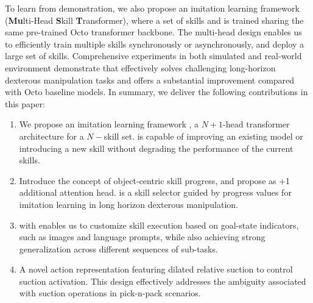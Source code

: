 To learn \progss from demonstration, we also propose an imitation learning framework \ours({\bf Mu}lti-Head {\bf S}kill {\bf T}ransformer), where a set of skills and \progss is trained sharing the same pre-trained Octo transformer backbone\cite{team2024octo}. 
The multi-head design enables us to efficiently train multiple skills synchronously or asynchronously, and deploy a large set of skills. Comprehensive experiments in both simulated and real-world environment demonstrate that \ours effectively solves challenging long-horizon dexterous manipulation tasks and offers a substantial improvement compared with Octo baseline models.
In summary, we deliver the following contributions in this paper:
\begin{enumerate}
        \item We propose an imitation learning framework \ours, a $N+1$-head transformer architecture for a $N-$skill set. 
        \ours is capable of improving an existing model or introducing a new skill without degrading the performance of the current skills.
        \item Introduce the concept of object-centric skill progress, and propose \progss as +1 additional attention head. \progss is a skill selector guided by progress values for imitation learning in long horizon dexterous manipulation.  
        \item \ours with \progss enables us to customize skill execution based on goal-state indicators, such as images and language prompts, while also achieving strong generalization across different sequences of sub-tasks.
        \item A novel action representation featuring dilated relative suction to control suction activation. This design effectively addresses the ambiguity associated with suction  operations in pick-n-pack scenarios.
    \end{enumerate}

